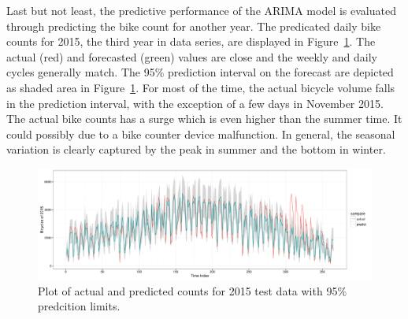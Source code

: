 \documentclass [11pt, proquest] {uwthesis}[2015/03/03]
\begin{document}
Last but not least, the predictive performance of the ARIMA model is evaluated through predicting the bike count for another year. The predicated daily bike counts for 2015, the third year in data series, are displayed in Figure~\ref{fig:arimapredict}. The actual (red) and forecasted (green) values are close and the weekly and daily cycles generally match. The 95\% prediction interval on the forecast are depicted as shaded area in Figure~\ref{fig:arimapredict}. For most of the time, the actual bicycle volume falls in the prediction interval, with the exception of a few days in November 2015. The actual bike counts has a surge which is even higher than the summer time. It could possibly due to a bike counter device malfunction. In general, the seasonal variation is clearly captured by the peak in summer and the bottom in winter.

\begin{figure}
   \includegraphics[width=1\textwidth]{figures/prediction/predbytime_arima} 
  \caption{Plot of actual and predicted counts for 2015 test data with 95\% predcition limits.}
  \label{fig:arimapredict}
\end{figure}

\end{document}
